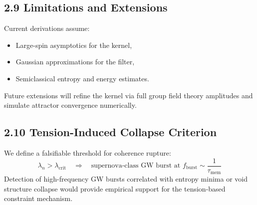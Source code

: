 \subsection{2.9 Limitations and Extensions}

Current derivations assume:
\begin{itemize}
    \item Large-spin asymptotics for the kernel,
    \item Gaussian approximations for the filter,
    \item Semiclassical entropy and energy estimates.
\end{itemize}
Future extensions will refine the kernel via full group field theory amplitudes and simulate attractor convergence numerically.

\subsection{2.10 Tension-Induced Collapse Criterion}

We define a falsifiable threshold for coherence rupture:
\begin{equation}
\lambda_n > \lambda_{\text{crit}} \quad \Rightarrow \quad \text{supernova-class GW burst at } f_{\text{burst}} \sim \frac{1}{\tau_{\text{mem}}}
\end{equation}
Detection of high-frequency GW bursts correlated with entropy minima or void structure collapse would provide empirical support for the tension-based constraint mechanism.
